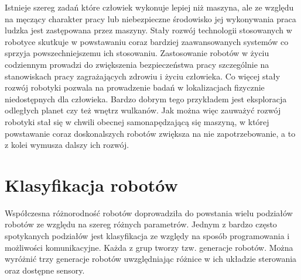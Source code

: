 Istnieje szereg zadań które człowiek wykonuje lepiej niż maszyna,
ale ze względu na męczący charakter pracy lub niebezpieczne środowisko jej wykonywania praca
ludzka jest zastępowana przez maszyny. Stały rozwój technologii stosowanych w
robotyce skutkuje w powstawaniu coraz bardziej zaawansowanych systemów co sprzyja
powszechniejszemu ich stosowaniu. Zastosowanie robotów w życiu codziennym
prowadzi do zwiększenia bezpieczeństwa pracy szczególnie na stanowiskach pracy
zagrażających zdrowiu i życiu człowieka. Co więcej stały rozwój robotyki pozwala
na prowadzenie badań w lokalizacjach fizycznie niedostępnych dla człowieka.
Bardzo dobrym tego przykładem jest eksploracja odległych planet czy też wnętrz
wulkanów. Jak można więc zauważyć rozwój robotyki stał się w chwili obecnej
samonapędzającą się maszyną, w której powstawanie coraz doskonalszych robotów
zwiększa na nie zapotrzebowanie, a to z kolei wymusza dalszy ich rozwój.
\newpage\section{Klasyfikacja robotów}
Współczesna różnorodność robotów doprowadziła do powstania wielu podziałów
robotów ze względu na szereg różnych parametrów. Jednym z bardzo często
spotykanych podziałów jest klasyfikacja ze względy na sposób programowania i
możliwości komunikacyjne. Każda z grup tworzy tzw. generacje robotów. Można
wyróżnić trzy generacje robotów uwzględniając różnice w ich układzie sterowania
oraz dostępne sensory\cite{website:robotyka-pl}.
